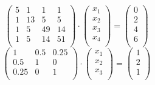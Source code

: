 \documentclass{report}
\begin{document}
        \begin{equation}
        \begin{pmatrix}
		5 & 1 & 1 & 1 \\
		1 & 13 & 5 & 5 \\
		1 & 5 & 49 & 14 \\
		1 & 5 & 14 & 51 \\
        \end{pmatrix}
        \cdot
        \begin{pmatrix}
          x_1 \\
          x_2 \\
          x_3 \\
          x_4 \\
        \end{pmatrix}
        =
        \begin{pmatrix}
		0 \\
		2 \\
		4 \\
		6 \\
        \end{pmatrix}
        \label{syst3}
        \end{equation}
        \begin{equation}
        \begin{pmatrix}
		1 & 0.5 & 0.25 \\
		0.5 & 1 & 0 \\
		0.25 & 0 & 1 \\
        \end{pmatrix}
        \cdot
        \begin{pmatrix}
          x_1 \\
          x_2 \\
          x_3 \\
        \end{pmatrix}
        =
        \begin{pmatrix}
		1 \\
		2 \\
		1 \\
        \end{pmatrix}
        \label{syst4}
        \end{equation}
\end{document}
